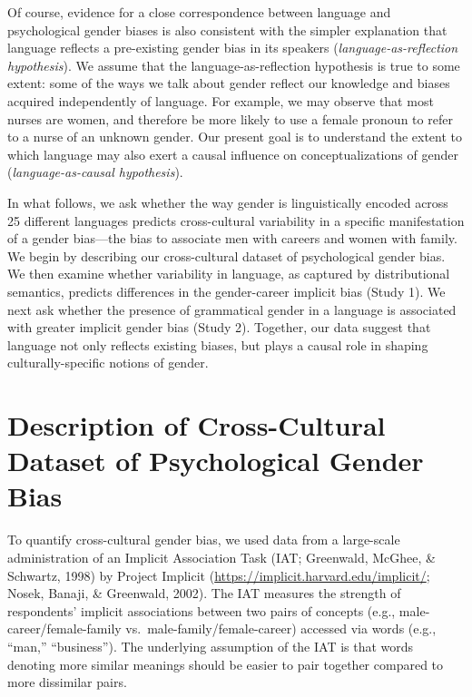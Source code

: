 \documentclass[man,floatsintext]{apa6}
\theoremstyle{definition}
\theoremstyle{definition}
\theoremstyle{definition}
\theoremstyle{remark}
\begin{document}
Of course, evidence for a close correspondence between language and
psychological gender biases is also consistent with the simpler
explanation that language reflects a pre-existing gender bias in its
speakers (\emph{language-as-reflection hypothesis}). We assume that the
language-as-reflection hypothesis is true to some extent: some of the
ways we talk about gender reflect our knowledge and biases acquired
independently of language. For example, we may observe that most nurses
are women, and therefore be more likely to use a female pronoun to refer
to a nurse of an unknown gender. Our present goal is to understand the
extent to which language may also exert a causal influence on
conceptualizations of gender (\emph{language-as-causal hypothesis}).

In what follows, we ask whether the way gender is linguistically encoded
across 25 different languages predicts cross-cultural variability in a
specific manifestation of a gender bias---the bias to associate men with
careers and women with family. We begin by describing our cross-cultural
dataset of psychological gender bias. We then examine whether
variability in language, as captured by distributional semantics,
predicts differences in the gender-career implicit bias (Study 1). We
next ask whether the presence of grammatical gender in a language is
associated with greater implicit gender bias (Study 2). Together, our
data suggest that language not only reflects existing biases, but plays
a causal role in shaping culturally-specific notions of gender.

\section{Description of Cross-Cultural Dataset of Psychological Gender
Bias}\label{description-of-cross-cultural-dataset-of-psychological-gender-bias}

To quantify cross-cultural gender bias, we used data from a large-scale
administration of an Implicit Association Task (IAT; Greenwald, McGhee,
\& Schwartz, 1998) by Project Implicit
(\url{https://implicit.harvard.edu/implicit/}; Nosek, Banaji, \&
Greenwald, 2002). The IAT measures the strength of respondents' implicit
associations between two pairs of concepts (e.g.,
male-career/female-family vs.~male-family/female-career) accessed via
words (e.g., \enquote{man,} \enquote{business}). The underlying
assumption of the IAT is that words denoting more similar meanings
should be easier to pair together compared to more dissimilar pairs.
\end{document}
